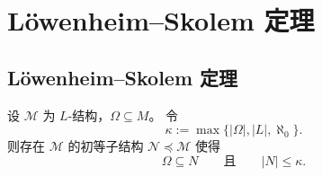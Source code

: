 \documentclass[lang=cn,a4paper,newtx,section]{elegantbook}
\begin{document}
\chapter{Löwenheim--Skolem 定理}

\section{Löwenheim--Skolem 定理}

 \begin{theorem}
 \label{downward-loewenheim-skolem}
 设 $\mathcal M$ 为 $L$-结构，$\Omega\subseteq M$。
 令
 \[
   \kappa:=\max\{\lvert\Omega\rvert,\lvert L\rvert,\aleph_0\}.
 \]
 则存在 $\mathcal M$ 的初等子结构 $\mathcal N\preccurlyeq\mathcal M$ 使得
 \[
   \Omega\subseteq N\qquad\text{且}\qquad \lvert N\rvert\le\kappa.
 \]
 \end{theorem}
\end{document}
